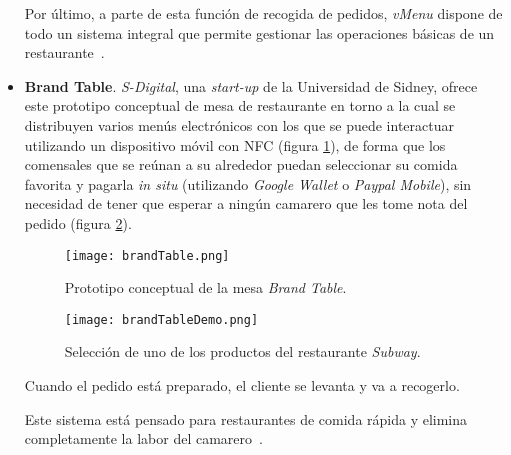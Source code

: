 \begin{itemize}
    Por último, a parte de esta función de recogida de pedidos, \emph{vMenu} 
    dispone de todo un sistema integral que permite gestionar las operaciones
    básicas de un restaurante~\cite{bib:vMenu}.

    \item \textbf{Brand Table}. \emph{S-Digital}, una \emph{start-up} de la
    Universidad de Sidney, ofrece este prototipo conceptual de mesa de
    restaurante en torno a la cual se distribuyen varios menús electrónicos con
    los que se puede interactuar utilizando un dispositivo móvil con \acs{NFC}
    (figura \ref{fig:brandTable}), de forma que los comensales que se reúnan a 
    su alrededor puedan seleccionar su comida favorita y pagarla
    \emph{in situ} (utilizando \emph{Google Wallet} o \emph{Paypal Mobile}), 
    sin necesidad de tener que esperar a ningún camarero que les tome nota del 
    pedido (figura \ref{fig:brandTableDemo}).

    \begin{figure}[!h]
      \begin{center}
        \texttt{[image: brandTable.png]}
        \caption{Prototipo conceptual de la mesa \emph{Brand Table}.}
        \label{fig:brandTable}
      \end{center}
    \end{figure}

    \begin{figure}[!h]
      \begin{center}
        \texttt{[image: brandTableDemo.png]}
        \caption{Selección de uno de los productos del restaurante
        \emph{Subway}.}
        \label{fig:brandTableDemo}
      \end{center}
    \end{figure}

    Cuando el pedido está preparado, el cliente se levanta y va a recogerlo.
    
    Este sistema está pensado para restaurantes de comida rápida y elimina
    completamente la labor del camarero~\cite{bib:brandTable}.
    \end{itemize}



